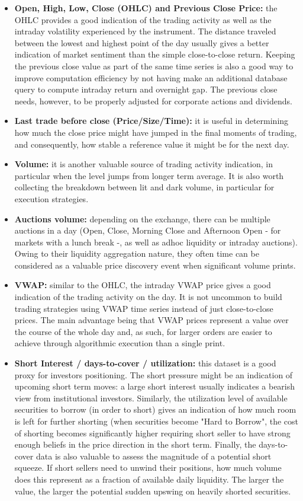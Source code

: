 \begin{itemize}
\item \textbf{Open, High, Low, Close (OHLC) and Previous Close Price:} the OHLC provides a good indication of the trading activity as well as the intraday volatility experienced by the instrument. The distance traveled between the lowest and highest point of the day usually gives a better indication of market sentiment than the simple close-to-close return. Keeping the previous close value as part of the same time series is also a good way to improve computation efficiency by not having make an additional database query to compute intraday return and overnight gap. The previous close needs, however, to be properly adjusted for corporate actions and dividends. 
\item \textbf{Last trade before close (Price/Size/Time):} it is useful in determining how much the close price might have jumped in the final moments of trading, and consequently, how stable a reference value it might be for the next day.
\item \textbf{Volume:} it is another valuable source of trading activity indication, in particular when the level jumps from longer term average. It is also worth collecting the breakdown between lit and dark volume, in particular for execution strategies.
\item \textbf{Auctions volume:} depending on the exchange, there can be multiple auctions in a day (Open, Close, Morning Close and Afternoon Open - for markets with a lunch break -, as well as adhoc liquidity or intraday auctions). Owing to their liquidity aggregation nature, they often time can be considered as a valuable price discovery event when significant volume prints.
\item \textbf{VWAP:} similar to the OHLC, the intraday VWAP price gives a good indication of the trading activity on the day. It is not uncommon to build trading strategies using VWAP time series instead of just close-to-close prices. The main advantage being that VWAP prices represent a value over the course of the whole day and, as such, for larger orders are easier to achieve through algorithmic execution than a single print.
\item \textbf{Short Interest / days-to-cover / utilization:} this dataset is a good proxy for investors positioning. The short pressure might be an indication of upcoming short term moves: a large short interest usually indicates a bearish view from institutional investors. Similarly, the utilization level of available securities to borrow (in order to short) gives an indication of how much room is left for further shorting (when securities become "Hard to Borrow", the cost of shorting becomes significantly higher requiring short seller to have strong enough beliefs in the price direction in the short term. Finally, the days-to-cover data is also valuable to assess the magnitude of a potential short squeeze. If short sellers need to unwind their positions, how much volume does this represent as a fraction of available daily liquidity. The larger the value, the larger the potential sudden upswing on heavily shorted securities.

\end{itemize}
